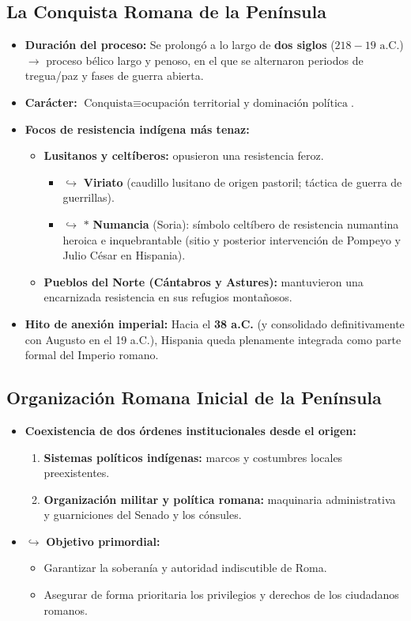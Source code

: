 \documentclass[11pt,letterpaper]{article}
\begin{document}
\subsection{La Conquista Romana de la Península}
\begin{itemize}
  \item \textbf{Duración del proceso:} Se prolongó a lo largo de \textbf{dos siglos} ($218 - 19\text{ a.C.}$) $\rightarrow$ proceso bélico largo y penoso, en el que se alternaron periodos de tregua/paz y fases de guerra abierta.
  \item \textbf{Carácter:} $\text{Conquista} \equiv \text{ocupación territorial y dominación política}$.
  \item \textbf{Focos de resistencia indígena más tenaz:}
  \begin{itemize}
    \item \textbf{Lusitanos y celtíberos:} opusieron una resistencia feroz.
    \begin{itemize}
      \item $\hookrightarrow$ \textbf{Viriato} (caudillo lusitano de origen pastoril; táctica de guerra de guerrillas).
      \item $\hookrightarrow$ $*$ \textbf{Numancia} (Soria): símbolo celtíbero de resistencia numantina heroica e inquebrantable (sitio y posterior intervención de Pompeyo y Julio César en Hispania).
    \end{itemize}
    \item \textbf{Pueblos del Norte (Cántabros y Astures):} mantuvieron una encarnizada resistencia en sus refugios montañosos.
  \end{itemize}
  \item \textbf{Hito de anexión imperial:} Hacia el \textbf{38 a.C.} (y consolidado definitivamente con Augusto en el 19 a.C.), Hispania queda plenamente integrada como parte formal del Imperio romano.
\end{itemize}

\subsection{Organización Romana Inicial de la Península}
\begin{itemize}
  \item \textbf{Coexistencia de dos órdenes institucionales desde el origen:}
  \begin{enumerate}
    \item \textbf{Sistemas políticos indígenas:} marcos y costumbres locales preexistentes.
    \item \textbf{Organización militar y política romana:} maquinaria administrativa y guarniciones del Senado y los cónsules.
  \end{enumerate}
  \item $\hookrightarrow$ \textbf{Objetivo primordial:}
  \begin{itemize}
    \item Garantizar la soberanía y autoridad indiscutible de Roma.
    \item Asegurar de forma prioritaria los privilegios y derechos de los ciudadanos romanos.
  \end{itemize}
\end{itemize}
\end{document}
